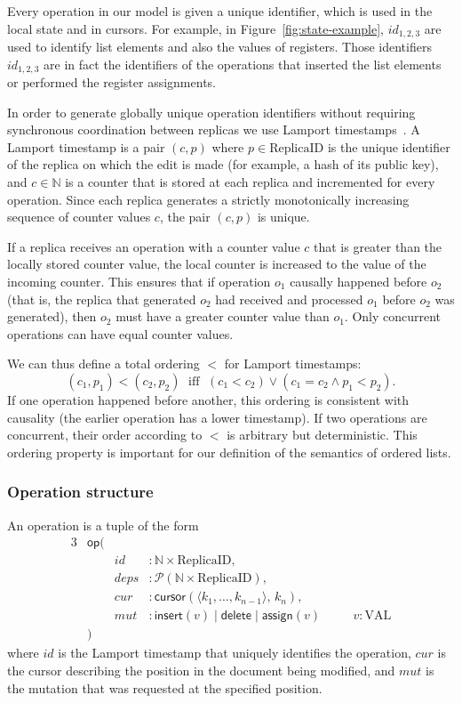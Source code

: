 \documentclass[10pt,journal,compsoc]{IEEEtran}
\begin{document}
Every operation in our model is given a unique identifier, which is used in the local state and in cursors. For example, in Figure~\ref{fig:state-example}, $\mathit{id}_{1,2,3}$ are used to identify list elements and also the values of registers. Those identifiers $\mathit{id}_{1,2,3}$ are in fact the identifiers of the operations that inserted the list elements or performed the register assignments.

In order to generate globally unique operation identifiers without requiring synchronous coordination between replicas we use Lamport timestamps~\cite{Lamport:1978jq}. A Lamport timestamp is a pair $(c, p)$ where $p \in \mathrm{ReplicaID}$ is the unique identifier of the replica on which the edit is made (for example, a hash of its public key), and $c \in \mathbb{N}$ is a counter that is stored at each replica and incremented for every operation. Since each replica generates a strictly monotonically increasing sequence of counter values $c$, the pair $(c, p)$ is unique.

If a replica receives an operation with a counter value $c$ that is greater than the locally stored counter value, the local counter is increased to the value of the incoming counter. This ensures that if operation $o_1$ causally happened before $o_2$ (that is, the replica that generated $o_2$ had received and processed $o_1$ before $o_2$ was generated), then $o_2$ must have a greater counter value than $o_1$. Only concurrent operations can have equal counter values.

We can thus define a total ordering $<$ for Lamport timestamps:
\[ (c_1, p_1) < (c_2, p_2) \;\text{ iff }\; (c_1 < c_2) \vee (c_1 = c_2 \wedge p_1 < p_2). \]
If one operation happened before another, this ordering is consistent with causality (the earlier operation has a lower timestamp). If two operations are concurrent, their order according to $<$ is arbitrary but deterministic. This ordering property is important for our definition of the semantics of ordered lists.

\subsubsection{Operation structure}

An operation is a tuple of the form
\begin{alignat*}{3}
& \mathsf{op}( \\
&& \mathit{id} &: \mathbb{N} \times \mathrm{ReplicaID}, \\
&& \mathit{deps} &: \mathcal{P}(\mathbb{N} \times \mathrm{ReplicaID}), \\
&& \mathit{cur} &: \mathsf{cursor}(\langle k_1, \dots, k_{n-1} \rangle,\, k_n), \\
&& \mathit{mut} &: \mathsf{insert}(v) \mid \mathsf{delete} \mid \mathsf{assign}(v) && \quad v: \mathrm{VAL} \\
& )
\end{alignat*}
where $\mathit{id}$ is the Lamport timestamp that uniquely identifies the operation, $\mathit{cur}$ is the cursor describing the position in the document being modified, and $\mathit{mut}$ is the mutation that was requested at the specified position.
\end{document}
